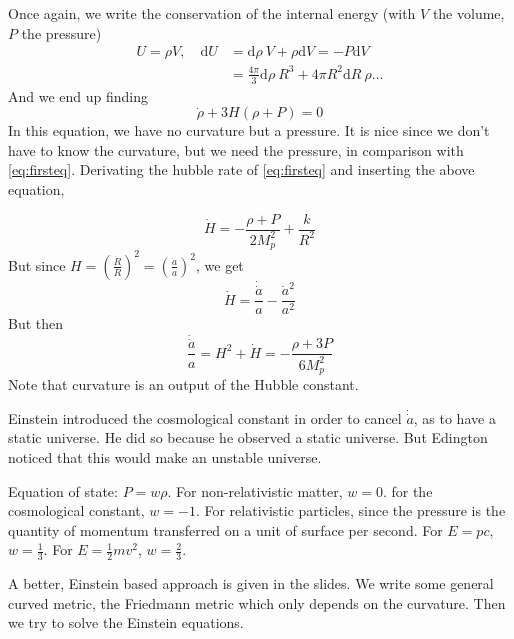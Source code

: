 \documentclass[a4paper]{book}
\theoremstyle{definition}
\theoremstyle{remark}
\begin{document}
Once again, we write the conservation of the internal energy (with $V$ the volume, $P$ the pressure)
\begin{equation}
   \begin{aligned}
    U = \rho V,\quad \text{d}U &= \text{d}\rho ~V + \rho \text{d}V = -P\text{d}V \\
    &= \frac{4\pi}{3}\text{d}\rho~ R^3 + 4\pi R^2 \text{d}R ~\rho \dots 
   \end{aligned}
\end{equation}
And we end up finding 
\begin{equation}
    \dot \rho + 3H(\rho + P) = 0
\label{eq:eq2}\end{equation}
In this equation, we have no curvature but a pressure. It is nice since we don't have to know the curvature, but we need the pressure, in comparison with \eqref{eq:firsteq}. Derivating the hubble rate of \eqref{eq:firsteq} and inserting the above equation, 

\begin{equation}
    \dot H = -\frac{\rho + P}{2M_p^2} + \frac{k}{R^2}
\end{equation}
But since $H = \left(\frac{\dot R}{R}\right)^2 = \left(\frac{\dot a}{a}\right)^2$, we get 
\begin{equation}
    \dot H = \frac{\dot{\dot a}}{a} - \frac{\dot a^2}{a^2}
\end{equation}
But then 
\begin{equation}
    \frac{\dot {\dot a}}{a} = H^2 + \dot H = -\frac{\rho + 3P}{6M_p^2}
\end{equation}
Note that curvature is an output of the Hubble constant. \par \medskip

Einstein introduced the cosmological constant in order to cancel $\dot{\dot a}$, as to have a static universe. He did so because he observed a static universe. But Edington noticed that this would make an unstable universe. \par \medskip 

Equation of state: $P =w\rho$. For non-relativistic matter, $w = 0$. for the cosmological constant, $w = -1$. For relativistic particles, since the pressure is the quantity of momentum transferred on a unit of surface per second. For $E=pc$, $w = \frac{1}{3}$. For $E = \frac{1}{2}mv^2$, $w = \frac{2}{3}$. \par \medskip 

A better, Einstein based approach is given in the slides. We write some general curved metric, the Friedmann metric which only depends on the curvature. Then we try to solve the Einstein equations. \par \medskip 
\end{document}
